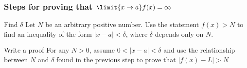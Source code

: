 \subsubsection{Steps for proving that $\limit{x \rightarrow a} f(x) = \infty$}
\begin{enumdescript}
    \item[Find $\delta$] Let $N$ be an arbitrary positive number. Use the statement $f(x) > N$ to find an inequality of the form $|x - a| < \delta$, where $\delta$ depends only on $N$.
    \item[Write a proof] For any $N > 0$, assume $0 < |x - a| < \delta$ and use the relationship between $N$ and $\delta$ found in the previous step to prove that $|f(x) - L| > N$
\end{enumdescript}
